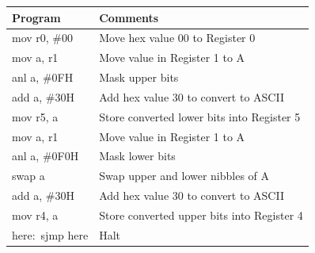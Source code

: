 \documentclass[12pt,a4paper]{article}
\begin{document}
\begin{flushleft}
\begin{table}[htb]
\centering
\begin{tabular}{|l|l|} 
\hline
\textbf{Program}                                                 & \textbf{Comments}                             \\ 
\hline
\hline
mov r0, \#00                                                     & Move hex value 00 to Register 0               \\
\hline
mov a, r1                                                        & Move value in Register 1 to A                 \\
\hline
anl a, \#0FH                                                      & Mask upper bits                              \\
\hline
add a, \#30H                                                      & Add hex value 30 to convert to ASCII         \\
\hline
mov r5, a                                                        & Store converted lower bits into Register 5    \\
\hline
mov a, r1                                                        & Move value in Register 1 to A                 \\
\hline
anl a, \#0F0H                                                     & Mask lower bits                              \\
\hline
swap a                                                           & Swap upper and lower nibbles of A             \\
\hline
add a, \#30H                                                      & Add hex value 30 to convert to ASCII         \\
\hline 
mov r4, a                                                        & Store converted upper bits into Register 4    \\
\hline
here:~sjmp here                                                  & Halt                                          \\
\hline
\end{tabular}
\end{table}


\end{flushleft}
\end{document}
